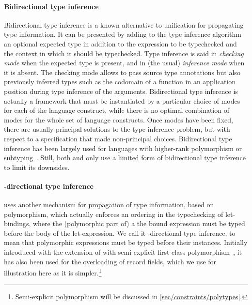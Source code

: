 \documentclass[acmsmall,screen,nonacm]{acmart}
\begin{document}
\paragraph{Bidirectional type inference}

Bidirectional type inference is a known alternative to unification for
propagating type information. It can be presented by adding to the type
inference algorithm an optional expected type in addition to the expression
to be typechecked and the context in which it should be typechecked.  Type
inference is said in \emph{checking mode} when the expected type is present,
and in (the usual) \emph{inference mode} when it is absent. The checking
mode allows to pass source type annotations but also previously inferred
types such as the codomain of a function in an application position during
type inference of the arguments.
%
Bidirectional type inference is actually a framework that must be
instantiated by a particular choice of modes for each of the language
construct, while there is no optimal combination of modes for the whole set
of language constructs. Once modes have been fixed, there are usually
principal solutions to the type inference problem, but with respect to a
specification that made non-principal choices.
%
Bidirectional type inference has been largely used for languages with
higher-rank polymorphism or subtyping~. Still, both \OCaml
and \Haskell only use a limited form of bidirectional type inference to
limit its downsides.


\paragraph{\Geninst-directional type inference}

\OCaml uses another mechanism for propagation of type information,
based on polymorphism, which actually enforces an ordering in the
typechecking of let-bindings, where the (polymorphic part of) a the
bound expression must be typed before the body of the let-expression.
We call it \textbf{\geninst}-directional type inference, to mean that
polymorphic expressions must be typed before their
instances.  Initially introduced with the extension of \ML with
semi-explicit first-class polymorphism~\cite {Garrigue-Remy/poly-ml},
it has also been used for the overloading of record fields, which we
use for illustration here as it is simpler.\footnote {Semi-explicit
  polymorphism will be discussed in \cref{sec/constraints/polytypes}.}
\end{document}
